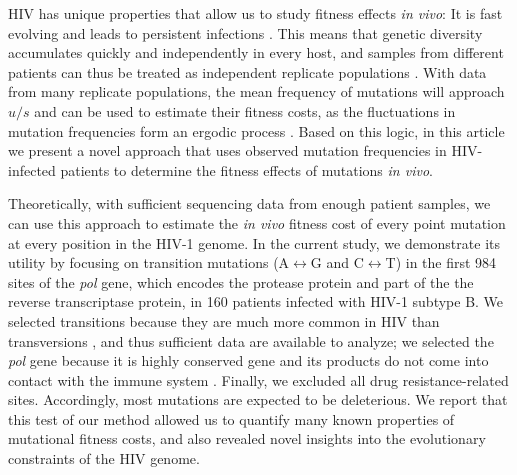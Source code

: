 \documentclass{article}
\begin{document}
HIV has unique properties that allow us to study fitness effects \textit {in vivo}: It is fast evolving \cite{roberts1988accuracy, mansky1995lower, abram2010nature,cuevas2015extremely,zanini2016vivo} and leads to persistent infections \cite{coffin1995hiv,coffin1997retrotransposons, douek2003t}. This means that genetic diversity accumulates quickly and independently in every host, and samples from different patients can thus be treated as independent replicate populations \cite{pennings2014loss}. With data from many replicate populations, the mean frequency of mutations will approach $u/s$ and can be used to estimate their fitness costs, as the fluctuations in mutation frequencies form %
an ergodic process \cite{karlin2014}. Based on this logic, in this article we present a novel approach that uses observed mutation frequencies in HIV-infected patients to determine the fitness effects of mutations \textit {in vivo}. 

Theoretically, with sufficient sequencing data from enough patient samples, we can use this approach to estimate the \textit {in vivo} fitness cost of every point mutation at every position in the HIV-1 genome. In the current study, we demonstrate its utility by focusing on transition mutations (A$\leftrightarrow$G and C$\leftrightarrow$T) in the first 984 sites of the \textit {pol} gene, which encodes the protease protein and part of the the reverse transcriptase protein, in 160 patients infected with HIV-1 subtype B. We selected transitions because they are much more common in HIV than transversions \cite{abram2010nature}, and thus sufficient data are available to analyze; we selected the \textit {pol} gene because it is highly conserved gene and its products do not come into contact with the immune system \cite{coffin1995hiv, coffin1997retrotransposons}. Finally, we excluded all drug resistance-related sites. Accordingly, most mutations are expected to be deleterious. We report that this test of our method allowed us to quantify many known properties of mutational fitness costs, and also revealed novel insights into the evolutionary constraints of the HIV genome. %
\end{document}
